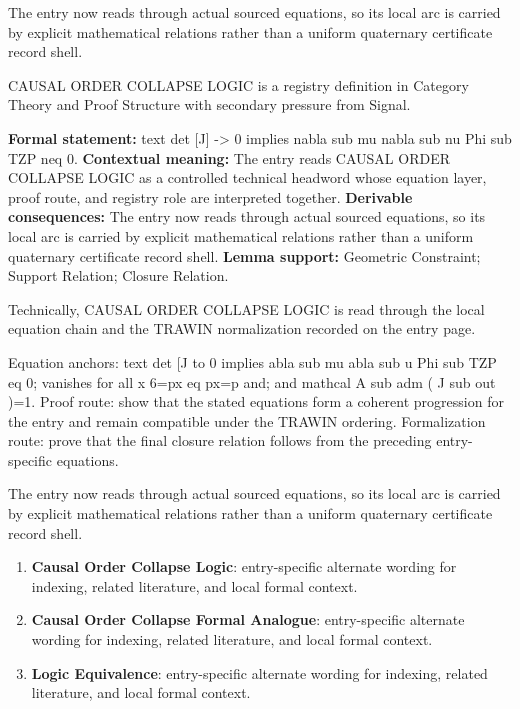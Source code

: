 The entry now reads through actual sourced equations, so its local arc is carried by explicit mathematical relations rather than a uniform quaternary certificate record shell.
\clearpage


\begingroup\small
{}
CAUSAL ORDER COLLAPSE LOGIC is a registry definition in Category Theory and Proof Structure with secondary pressure from Signal.

\begingroup\footnotesize\setlength{\emergencystretch}{3em}\sloppy
\textbf{Formal statement:} text det [J] -> 0 implies nabla sub mu nabla sub nu Phi sub TZP neq 0. \textbf{Contextual meaning:} The entry reads CAUSAL ORDER COLLAPSE LOGIC as a controlled technical headword whose equation layer, proof route, and registry role are interpreted together. \textbf{Derivable consequences:} The entry now reads through actual sourced equations, so its local arc is carried by explicit mathematical relations rather than a uniform quaternary certificate record shell. \textbf{Lemma support:} Geometric Constraint; Support Relation; Closure Relation.\par
\endgroup

Technically, CAUSAL ORDER COLLAPSE LOGIC is read through the local equation chain and the TRAWIN normalization recorded on the entry page.

Equation anchors: text det [J to 0 implies abla sub mu abla sub u Phi sub TZP eq 0; vanishes for all x 6=px eq px=p and; and mathcal A sub adm ( J sub out )=1. Proof route: show that the stated equations form a coherent progression for the entry and remain compatible under the TRAWIN ordering. Formalization route: prove that the final closure relation follows from the preceding entry-specific equations.

The entry now reads through actual sourced equations, so its local arc is carried by explicit mathematical relations rather than a uniform quaternary certificate record shell.
\endgroup

\begin{enumerate}[leftmargin=1.6em,itemsep=6pt,topsep=4pt]
\item \textbf{Causal Order Collapse Logic}: entry-specific alternate wording for indexing, related literature, and local formal context.
\item \textbf{Causal Order Collapse Formal Analogue}: entry-specific alternate wording for indexing, related literature, and local formal context.
\item \textbf{Logic Equivalence}: entry-specific alternate wording for indexing, related literature, and local formal context.
\end{enumerate}


